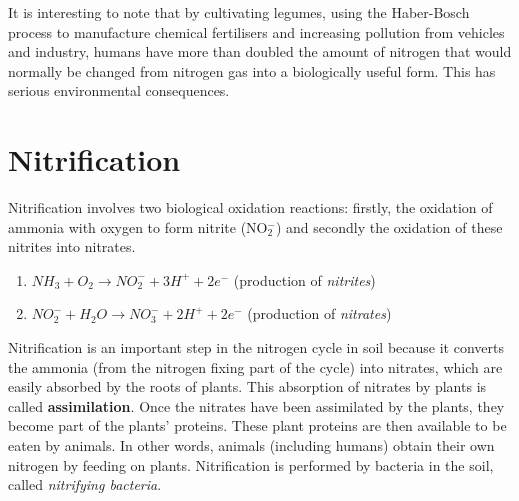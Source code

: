 \begin{IFact}{It is interesting to note that by cultivating legumes, using the Haber-Bosch process to manufacture chemical fertilisers and increasing pollution from vehicles and industry, humans have more than doubled the amount of nitrogen that would normally be changed from nitrogen gas into a biologically useful form. This has serious environmental consequences.}
\end{IFact}







\section{Nitrification}
\label{sec:global cycles:nitrification}

Nitrification involves two biological oxidation reactions: firstly, the oxidation of ammonia with oxygen to form nitrite (NO$_{2}^{-}$) and secondly the oxidation of these nitrites into nitrates. 

\begin{center}
\begin{enumerate}
\item{\rm${NH_{3} + O_{2} \rightarrow NO_{2}^{-} + 3H^{+} + 2e^{-}}$ (production of \textit{nitrites})}

\item{\rm${NO_{2}^{-} + H_{2}O \rightarrow NO_{3}^{-} + 2H^{+} + 2e^{-}}$ (production of \textit{nitrates})}
\end{enumerate}
\end{center}

Nitrification is an important step in the nitrogen cycle in soil because it converts the ammonia (from the nitrogen fixing part of the cycle) into nitrates, which are easily absorbed by the roots of plants. This absorption of nitrates by plants is called \textbf{assimilation}. Once the nitrates have been assimilated by the plants, they become part of the plants' proteins. These plant proteins are then available to be eaten by animals. In other words, animals (including humans) obtain their own nitrogen by feeding on plants. Nitrification is performed by bacteria in the soil, called \textit{nitrifying bacteria}. \\

